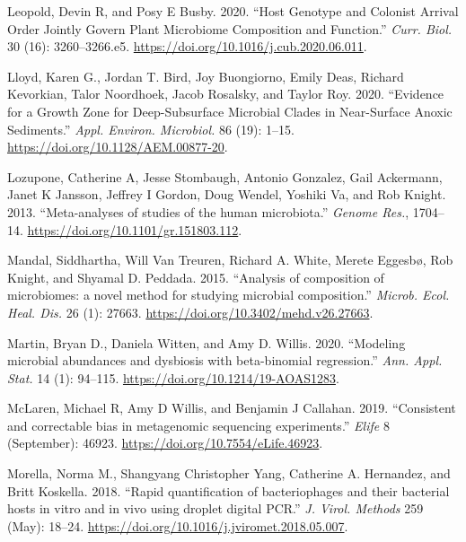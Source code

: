 \documentclass[
]{article}
\newlength{\cslhangindent}
\newlength{\cslentryspacingunit} %
\newenvironment{CSLReferences}[2] %
 {%
  \setlength{\parindent}{0pt}
  \ifodd #1
  \let\oldpar\par
  \def\par{\hangindent=\cslhangindent\oldpar}
  \fi
  \setlength{\parskip}{#2\cslentryspacingunit}
 }%
 {}
\begin{document}
\begin{CSLReferences}{1}{0}
\leavevmode{}%
Leopold, Devin R, and Posy E Busby. 2020. {``{Host Genotype and Colonist Arrival Order Jointly Govern Plant Microbiome Composition and Function}.''} \emph{Curr. Biol.} 30 (16): 3260--3266.e5. \url{https://doi.org/10.1016/j.cub.2020.06.011}.

\leavevmode{}%
Lloyd, Karen G., Jordan T. Bird, Joy Buongiorno, Emily Deas, Richard Kevorkian, Talor Noordhoek, Jacob Rosalsky, and Taylor Roy. 2020. {``{Evidence for a Growth Zone for Deep-Subsurface Microbial Clades in Near-Surface Anoxic Sediments}.''} \emph{Appl. Environ. Microbiol.} 86 (19): 1--15. \url{https://doi.org/10.1128/AEM.00877-20}.

\leavevmode{}%
Lozupone, Catherine A, Jesse Stombaugh, Antonio Gonzalez, Gail Ackermann, Janet K Jansson, Jeffrey I Gordon, Doug Wendel, Yoshiki Va, and Rob Knight. 2013. {``{Meta-analyses of studies of the human microbiota}.''} \emph{Genome Res.}, 1704--14. \url{https://doi.org/10.1101/gr.151803.112}.

\leavevmode{}%
Mandal, Siddhartha, Will Van Treuren, Richard A. White, Merete Eggesbø, Rob Knight, and Shyamal D. Peddada. 2015. {``{Analysis of composition of microbiomes: a novel method for studying microbial composition}.''} \emph{Microb. Ecol. Heal. Dis.} 26 (1): 27663. \url{https://doi.org/10.3402/mehd.v26.27663}.

\leavevmode{}%
Martin, Bryan D., Daniela Witten, and Amy D. Willis. 2020. {``{Modeling microbial abundances and dysbiosis with beta-binomial regression}.''} \emph{Ann. Appl. Stat.} 14 (1): 94--115. \url{https://doi.org/10.1214/19-AOAS1283}.

\leavevmode{}%
McLaren, Michael R, Amy D Willis, and Benjamin J Callahan. 2019. {``{Consistent and correctable bias in metagenomic sequencing experiments}.''} \emph{Elife} 8 (September): 46923. \url{https://doi.org/10.7554/eLife.46923}.

\leavevmode{}%
Morella, Norma M., Shangyang Christopher Yang, Catherine A. Hernandez, and Britt Koskella. 2018. {``{Rapid quantification of bacteriophages and their bacterial hosts in vitro and in vivo using droplet digital PCR}.''} \emph{J. Virol. Methods} 259 (May): 18--24. \url{https://doi.org/10.1016/j.jviromet.2018.05.007}.


\end{CSLReferences}
\end{document}
